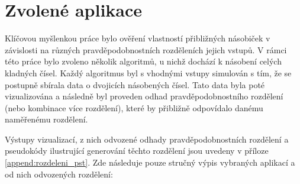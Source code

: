 \section{Zvolené aplikace} \label{zvolene_aplikace}
Klíčovou myšlenkou práce bylo ověření vlastností přibližných násobiček v závislosti na různých pravděpodobnostních rozděleních jejich vstupů. V rámci této práce bylo zvoleno několik algoritmů, u nichž dochází k násobení celých kladných čísel. Každý algoritmus byl s vhodnými vstupy simulován s tím, že se postupně sbírala data o dvojicích násobených čísel. Tato data byla poté vizualizována a následně byl proveden odhad pravděpodobnostního rozdělení (nebo kombinace více rozdělení), které by přibližně odpovídalo danému naměřenému rozdělení.

Výstupy vizualizací, z nich odvozené odhady pravděpodobnostních rozdělení a pseudokódy ilustrující generování těchto rozdělení jsou uvedeny v příloze \ref{append:rozdeleni_pst}. Zde následuje pouze stručný výpis vybraných aplikací a od nich odvozených rozdělení:

